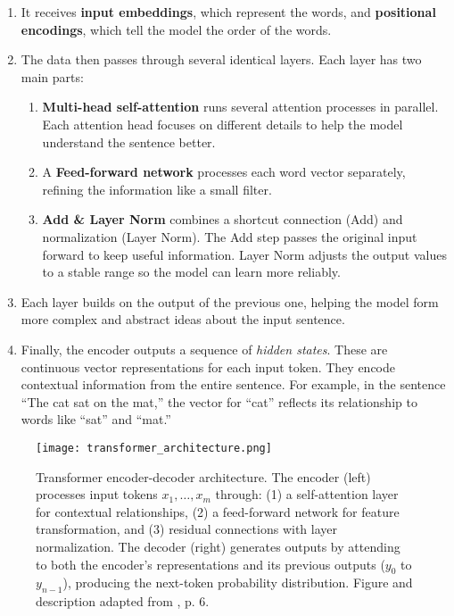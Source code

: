 \begin{enumerate}
    \item It receives \textbf{input embeddings}, which represent the words, and \textbf{positional encodings}, which tell the model the order of the words.
    
    \item The data then passes through several identical layers. Each layer has two main parts:
    \begin{enumerate}[label=\alph*.]
        \item \textbf{Multi-head self-attention} runs several attention processes in parallel. Each attention head focuses on different details to help the model understand the sentence better.
        \item A \textbf{Feed-forward network} processes each word vector separately, refining the information like a small filter.
        \item \textbf{Add \& Layer Norm} combines a shortcut connection (Add) and normalization (Layer Norm). The Add step passes the original input forward to keep useful information. Layer Norm adjusts the output values to a stable range so the model can learn more reliably.
    \end{enumerate}
    
    \item Each layer builds on the output of the previous one, helping the model form more complex and abstract ideas about the input sentence.
    
    \item Finally, the encoder outputs a sequence of \textit{hidden states}. These are continuous vector representations for each input token. They encode contextual information from the entire sentence. For example, in the sentence ``The cat sat on the mat,'' the vector for ``cat'' reflects its relationship to words like ``sat'' and ``mat.''
\end{enumerate}


\begin{figure}[ht]
    \centering
	\texttt{[image: transformer\_architecture.png]}	
    \caption{Transformer encoder-decoder architecture. The encoder (left) processes input tokens \(x_1,\dots,x_m\) through: (1) a self-attention layer for contextual relationships, (2) a feed-forward network for feature transformation, and (3) residual connections with layer normalization. The decoder (right) generates outputs by attending to both the encoder's representations and its previous outputs ($y_0$ to $y_{n-1}$), producing the next-token probability distribution. Figure and description adapted from \citet{xiaoIntroductionTransformersNLP2023}, p. 6.}
    \label{fig:transformer_architecture}
\end{figure}

